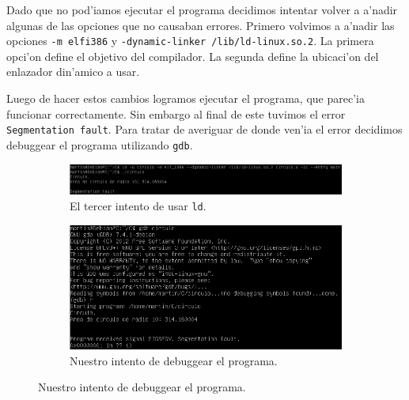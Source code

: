 \documentclass[11pt]{article}
\begin{document}
		Dado que no pod'iamos ejecutar el programa decidimos intentar volver a a'nadir algunas de las opciones que no causaban errores. Primero volvimos a a'nadir las opciones \texttt{-m elf\textunderscore\/i386} y \texttt{-dynamic-linker /lib/ld-linux.so.2}. La primera opci'on define el objetivo del compilador\footnotemark. La segunda define la ubicaci'on del enlazador din'amico\footnotemark\/ a usar.
		
		
		Luego de hacer estos cambios logramos ejecutar el programa, que parec'ia funcionar correctamente. Sin embargo al final de este tuvimos el error \texttt{Segmentation fault}. Para tratar de averiguar de donde ven'ia el error decidimos debuggear el programa utilizando \texttt{gdb}.
		
		\begin{figure}[H]
			\centering
			\begin{subfigure}[b!]{0.7\linewidth}
				\includegraphics[width=\linewidth]{Images/Seccion 1/S1 parte siete.PNG}
				\caption*{El tercer intento de usar \texttt{ld}.}
			\end{subfigure}
			\begin{subfigure}[b!]{0.7\linewidth}
				\includegraphics[width=\linewidth]{Images/Seccion 1/S1 parte ocho.PNG}
				\caption*{Nuestro intento de debuggear el programa.}
			\end{subfigure}
		\end{figure}
		
\end{document}
